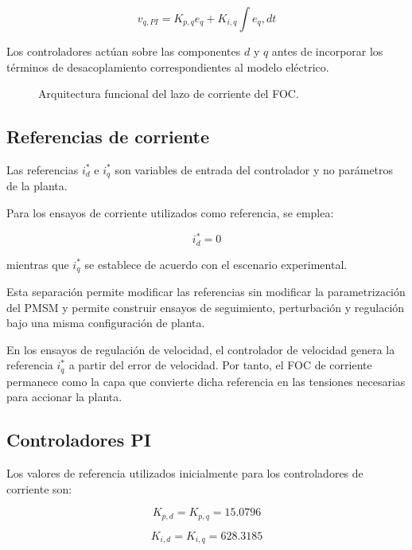 \begin{equation}
v_{q,PI}=K_{p,q}e_q+K_{i,q}\int e_q,dt
\end{equation}

Los controladores actúan sobre las componentes $d$ y $q$ antes de incorporar los términos de desacoplamiento correspondientes al modelo eléctrico.


\begin{figure}[H]
\centering
\resizebox{\textwidth}{!}{%

}
\caption{Arquitectura funcional del lazo de corriente del FOC.}
\label{fig:foc_lazo_corriente}
\end{figure}

\subsection{Referencias de corriente}

Las referencias $i_d^{*}$ e $i_q^{*}$ son variables de entrada del controlador y no parámetros de la planta.

Para los ensayos de corriente utilizados como referencia, se emplea:

\begin{equation}
i_d^{*}=0
\end{equation}

mientras que $i_q^{*}$ se establece de acuerdo con el escenario experimental.

Esta separación permite modificar las referencias sin modificar la parametrización del PMSM y permite construir ensayos de seguimiento, perturbación y regulación bajo una misma configuración de planta.

En los ensayos de regulación de velocidad, el controlador de velocidad genera la referencia $i_q^{*}$ a partir del error de velocidad. Por tanto, el FOC de corriente permanece como la capa que convierte dicha referencia en las tensiones necesarias para accionar la planta.

\subsection{Controladores PI}

Los valores de referencia utilizados inicialmente para los controladores de corriente son:

\begin{equation}
K_{p,d}=K_{p,q}=15.0796
\end{equation}

\begin{equation}
K_{i,d}=K_{i,q}=628.3185
\end{equation}


